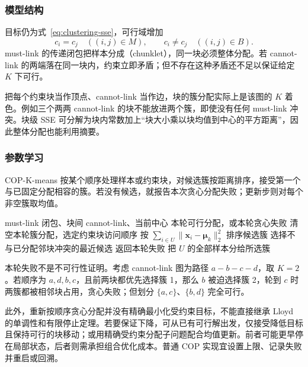 \subsubsection{模型结构}

目标仍为式~\eqref{eq:clustering-sse}，可行域增加
\begin{equation}
 c_i=c_j\quad((i,j)\in M),\qquad
 c_i\ne c_j\quad((i,j)\in B).
 \label{eq:clustering-cop}
\end{equation}
must-link 的传递闭包把样本分成（chunklet），同一块必须整体分配。若 cannot-link 的两端落在同一块内，约束立即矛盾；但不存在这种矛盾还不足以保证给定 $K$ 下可行。

把每个约束块当作顶点、cannot-link 当作边，块的簇分配实际上是该图的 $K$ 着色。例如三个两两 cannot-link 的块不能放进两个簇，即使没有任何 must-link 冲突。块级 SSE 可分解为块内常数加上“块大小乘以块均值到中心的平方距离”，因此整体分配也能利用摘要。

\subsubsection{参数学习}

COP-K-means 按某个顺序处理样本或约束块，对候选簇按距离排序，接受第一个与已固定分配相容的簇。若没有候选，就报告本次贪心分配失败；更新步则对每个非空簇取均值。

\begin{algorithm}
 \label{alg:clustering-cop}
 \begin{algorithmic}[1]
 \Require must-link 闭包、块间 cannot-link、当前中心
 \Ensure 本轮可行分配，或本轮贪心失败
 \State 清空本轮簇分配，选定约束块访问顺序
  \State 按 $\sum_{i\in U}\lVert\bm{x}_i-\bm{\mu}_k\rVert_2^2$ 排序候选簇
  \State 选择不与已分配邻块冲突的最近候选
   \State 返回本轮失败
  \EndIf
  \State 把 $U$ 的全部样本分给所选簇
 \EndFor
 \end{algorithmic}
\end{algorithm}

本轮失败不是不可行性证明。考虑 cannot-link 图为路径 $a-b-c-d$，取 $K=2$。若顺序为 $a,d,b,c$，且前两块都优先选择簇 1，那么 $b$ 被迫选择簇 2，轮到 $c$ 时两簇都被相邻块占用，贪心失败；但划分 $\{a,c\}$、$\{b,d\}$ 完全可行。

此外，重新按顺序贪心分配并没有精确最小化受约束目标，不能直接继承 Lloyd 的单调性和有限停止定理。若要保证下降，可从已有可行解出发，仅接受降低目标且保持可行的块移动；或用精确受约束分配子问题配合均值更新。前者可能更早停在局部状态，后者则需承担组合优化成本。普通 COP 实现宜设置上限、记录失败并重启或回溯。

